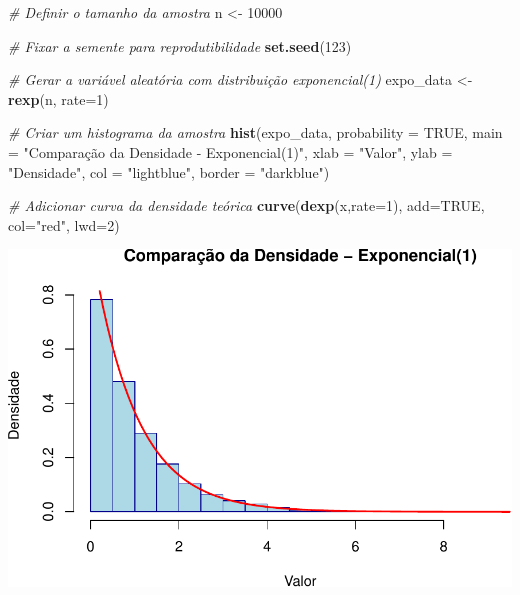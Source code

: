 \documentclass[
]{book}
\newenvironment{Shaded}{\begin{snugshade}}{\end{snugshade}}
\newcommand{\AttributeTok}[1]{\textcolor[rgb]{0.13,0.29,0.53}{#1}}
\newcommand{\CommentTok}[1]{\textcolor[rgb]{0.56,0.35,0.01}{\textit{#1}}}
\newcommand{\ConstantTok}[1]{\textcolor[rgb]{0.56,0.35,0.01}{#1}}
\newcommand{\DecValTok}[1]{\textcolor[rgb]{0.00,0.00,0.81}{#1}}
\newcommand{\FunctionTok}[1]{\textcolor[rgb]{0.13,0.29,0.53}{\textbf{#1}}}
\newcommand{\NormalTok}[1]{#1}
\newcommand{\OtherTok}[1]{\textcolor[rgb]{0.56,0.35,0.01}{#1}}
\newcommand{\StringTok}[1]{\textcolor[rgb]{0.31,0.60,0.02}{#1}}
\begin{document}
\begin{Shaded}
\begin{Highlighting}[]
\CommentTok{\# Definir o tamanho da amostra}
\NormalTok{n }\OtherTok{\textless{}{-}} \DecValTok{10000}

\CommentTok{\# Fixar a semente para reprodutibilidade}
\FunctionTok{set.seed}\NormalTok{(}\DecValTok{123}\NormalTok{)}

\CommentTok{\# Gerar a variável aleatória com distribuição exponencial(1)}
\NormalTok{expo\_data }\OtherTok{\textless{}{-}} \FunctionTok{rexp}\NormalTok{(n, }\AttributeTok{rate=}\DecValTok{1}\NormalTok{)}

\CommentTok{\# Criar um histograma da amostra }
\FunctionTok{hist}\NormalTok{(expo\_data, }\AttributeTok{probability =} \ConstantTok{TRUE}\NormalTok{, }
     \AttributeTok{main =} \StringTok{"Comparação da Densidade {-} Exponencial(1)"}\NormalTok{, }
     \AttributeTok{xlab =} \StringTok{"Valor"}\NormalTok{, }
     \AttributeTok{ylab =} \StringTok{"Densidade"}\NormalTok{, }
     \AttributeTok{col =} \StringTok{"lightblue"}\NormalTok{, }
     \AttributeTok{border =} \StringTok{"darkblue"}\NormalTok{)}

\CommentTok{\# Adicionar curva da densidade teórica}
\FunctionTok{curve}\NormalTok{(}\FunctionTok{dexp}\NormalTok{(x,}\AttributeTok{rate=}\DecValTok{1}\NormalTok{),}
      \AttributeTok{add=}\ConstantTok{TRUE}\NormalTok{,}
      \AttributeTok{col=}\StringTok{"red"}\NormalTok{,}
      \AttributeTok{lwd=}\DecValTok{2}\NormalTok{)}
\end{Highlighting}
\end{Shaded}

\includegraphics{introR_files/figure-latex/unnamed-chunk-276-1.pdf}
\end{document}
